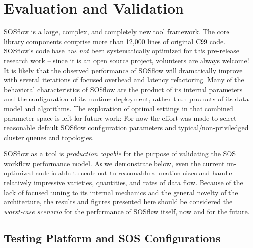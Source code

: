 
\section{Evaluation and Validation}

SOSflow is a large, complex, and completely new tool framework. The
core library components comprise more than 12,000 lines of original
C99 code. SOSflow's code base has \textit{not} been systematically
optimized for this pre-release research work -- since it is an open
source project, volunteers are always welcome! It is likely that the
observed performance of SOSflow will dramatically improve with several
iterations of focused overhead and latency refactoring. Many of the
behavioral characteristics of SOSflow are the product of its internal
parameters and the configuration of its runtime deployment, rather
than products of its data model and algorithms. The exploration of
optimal settings in that combined parameter space is left for future
work: For now the effort was made to select reasonable default SOSflow
configuration parameters and typical/non-priviledged cluster
queues and topologies.

SOSflow as a tool is \textit{production capable} for the purpose of
validating the SOS workflow performance model. As we demonstrate
below, even the current un-optimized code is able to scale out to
reasonable allocation sizes and handle relatively impressive
varieties, quantities, and rates of data flow. Because of the lack of
focused tuning to its internal mechanics and the general novelty of
the architecture, the results and figures presented here should be
considered the \textit{worst-case scenario} for the performance of
SOSflow itself, now and for the future.


\subsection{Testing Platform and SOS Configurations}




